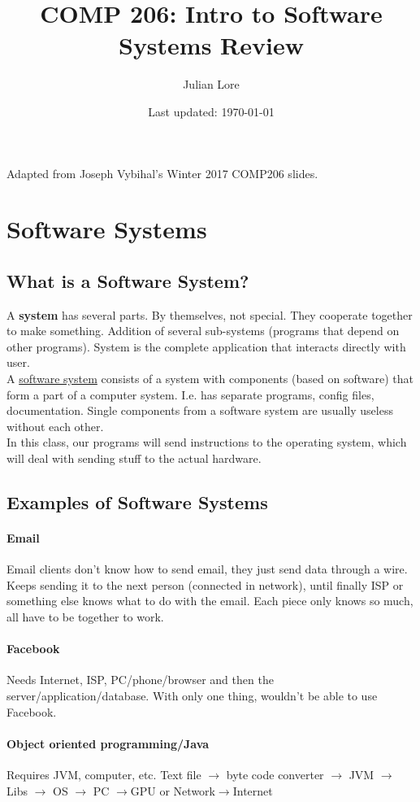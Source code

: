 \documentclass[12 pt]{article}
\author{Julian Lore}
\date{Last updated: \today}
\title{COMP 206: Intro to Software Systems Review}
\begin{document}
	\onehalfspacing
	\maketitle
	Adapted from Joseph Vybihal's Winter 2017 COMP206 slides.
	\tableofcontents
	\section{Software Systems}
	\subsection{What is a Software System?} 
	A \textbf{system} has several parts. By themselves, not special. They cooperate together to make something. Addition of several sub-systems (programs that depend on other programs). System is the complete application that interacts directly with user.
	\\
	A \href{https://en.wikipedia.org/wiki/Software_system}{software system} consists of a system with components (based on software) that form a part of a computer system. I.e. has separate programs, config files, documentation. Single components from a software system are usually useless without each other.
	\\ In this class, our programs will send instructions to the operating system, which will deal with sending stuff to the actual hardware.
	\subsection{Examples of Software Systems}
	\paragraph{Email} Email clients don't know how to send email, they just send data through a wire. Keeps sending it to the next person (connected in network), until finally ISP or something else knows what to do with the email. Each piece only knows so much, all have to be together to work. 
	\paragraph{Facebook}
	Needs Internet, ISP, PC/phone/browser and then the server/application/database. With only one thing, wouldn't be able to use Facebook.
	\paragraph{Object oriented programming/Java} Requires JVM, computer, etc. Text file $\to$ byte code converter $\to$ JVM $\to$ Libs $\to$ OS $\to$ PC $\to$GPU or Network$\to$Internet
\end{document}

